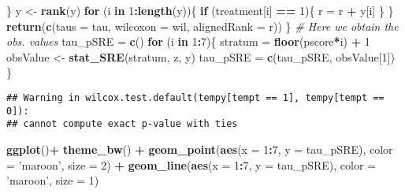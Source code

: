 \documentclass[]{article}
\newenvironment{Shaded}{\begin{snugshade}}{\end{snugshade}}
\newcommand{\KeywordTok}[1]{\textcolor[rgb]{0.13,0.29,0.53}{\textbf{#1}}}
\newcommand{\DataTypeTok}[1]{\textcolor[rgb]{0.13,0.29,0.53}{#1}}
\newcommand{\DecValTok}[1]{\textcolor[rgb]{0.00,0.00,0.81}{#1}}
\newcommand{\StringTok}[1]{\textcolor[rgb]{0.31,0.60,0.02}{#1}}
\newcommand{\CommentTok}[1]{\textcolor[rgb]{0.56,0.35,0.01}{\textit{#1}}}
\newcommand{\ControlFlowTok}[1]{\textcolor[rgb]{0.13,0.29,0.53}{\textbf{#1}}}
\newcommand{\OperatorTok}[1]{\textcolor[rgb]{0.81,0.36,0.00}{\textbf{#1}}}
\newcommand{\NormalTok}[1]{#1}
\begin{document}
\begin{Shaded}
\begin{Highlighting}[]
\NormalTok{  \}}
\NormalTok{  y <-}\StringTok{ }\KeywordTok{rank}\NormalTok{(y)}
  \ControlFlowTok{for}\NormalTok{ (i }\ControlFlowTok{in} \DecValTok{1}\OperatorTok{:}\KeywordTok{length}\NormalTok{(y))\{}
    \ControlFlowTok{if}\NormalTok{ (treatment[i] }\OperatorTok{==}\StringTok{ }\DecValTok{1}\NormalTok{)\{}
\NormalTok{      r =}\StringTok{ }\NormalTok{r }\OperatorTok{+}\StringTok{ }\NormalTok{y[i]}
\NormalTok{    \}}
\NormalTok{  \}}
  \KeywordTok{return}\NormalTok{(}\KeywordTok{c}\NormalTok{(}\DataTypeTok{taus =}\NormalTok{ tau, }\DataTypeTok{wilcoxon =}\NormalTok{ wil, }\DataTypeTok{alignedRank =}\NormalTok{ r))}
\NormalTok{\}}
\CommentTok{# Here we obtain the obs. values}
\NormalTok{tau_pSRE =}\StringTok{ }\KeywordTok{c}\NormalTok{()}
\ControlFlowTok{for}\NormalTok{ (i }\ControlFlowTok{in} \DecValTok{1}\OperatorTok{:}\DecValTok{7}\NormalTok{)\{}
\NormalTok{  stratum =}\StringTok{ }\KeywordTok{floor}\NormalTok{(pscore}\OperatorTok{*}\NormalTok{i) }\OperatorTok{+}\StringTok{ }\DecValTok{1}
\NormalTok{  obsValue <-}\StringTok{ }\KeywordTok{stat_SRE}\NormalTok{(stratum, z, y)}
\NormalTok{  tau_pSRE =}\StringTok{ }\KeywordTok{c}\NormalTok{(tau_pSRE, obsValue[}\DecValTok{1}\NormalTok{])}
\NormalTok{\}}
\end{Highlighting}
\end{Shaded}

\begin{verbatim}
## Warning in wilcox.test.default(tempy[tempt == 1], tempy[tempt == 0]):
## cannot compute exact p-value with ties
\end{verbatim}

\begin{Shaded}
\begin{Highlighting}[]
\KeywordTok{ggplot}\NormalTok{()}\OperatorTok{+}
\StringTok{  }\KeywordTok{theme_bw}\NormalTok{() }\OperatorTok{+}
\StringTok{  }\KeywordTok{geom_point}\NormalTok{(}\KeywordTok{aes}\NormalTok{(}\DataTypeTok{x =} \DecValTok{1}\OperatorTok{:}\DecValTok{7}\NormalTok{, }\DataTypeTok{y =}\NormalTok{ tau_pSRE), }\DataTypeTok{color =} \StringTok{'maroon'}\NormalTok{, }\DataTypeTok{size =} \DecValTok{2}\NormalTok{) }\OperatorTok{+}
\StringTok{  }\KeywordTok{geom_line}\NormalTok{(}\KeywordTok{aes}\NormalTok{(}\DataTypeTok{x =} \DecValTok{1}\OperatorTok{:}\DecValTok{7}\NormalTok{, }\DataTypeTok{y =}\NormalTok{ tau_pSRE), }\DataTypeTok{color =} \StringTok{'maroon'}\NormalTok{, }\DataTypeTok{size =} \DecValTok{1}\NormalTok{)}
\end{Highlighting}
\end{Shaded}
\end{document}
